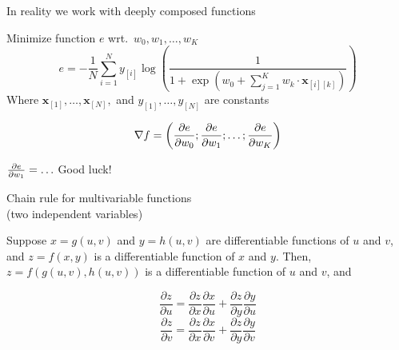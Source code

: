 \documentclass[12pt,aspectratio=169,handout]{beamer}
\begin{document}
\begin{frame}{In reality we work with deeply composed functions}
	
	\begin{example}
		Minimize function $e$ wrt.\ $w_0, w_1, \ldots, w_K$
		$$
		e = - \frac{1}{N} \sum_{i = 1}^{N} y_{[i]} \log
		\left(
		\frac{1}{1 +
			\exp\left( w_0 + \sum_{j=1}^{K} w_k \cdot \bm{x}_{[i][k]} \right)
		}
		\right)
		$$
		Where $\bm{x}_{[1]}, \ldots, \bm{x}_{[N]},$ and $y_{[1]}, \ldots, y_{[N]}$ are constants
	\end{example}
	
	\pause
	
	$$
	\nabla f = \left( \pdv{e}{w_0}; \pdv{e}{w_1}; \ldots; \pdv{e}{w_K} \right)
	$$
	
	$\pdv{e}{w_1} = \ldots$ \pause Good luck!
	
\end{frame}


%	
%	
%	
%	
%	


\begin{frame}{Chain rule for multivariable functions \\ (two independent variables)}
	
	Suppose $x=g(u,v)$ and $y=h(u,v)$ are differentiable functions of $u$ and $v$, and $z=f(x,y)$ is a differentiable function of $x$ and $y$. Then, $z=f(g(u,v),h(u,v))$ is a differentiable function of $u$ and $v$, and
	
	$$
	\frac{\partial z}{\partial u} = \frac{\partial z}{\partial x} \frac{\partial x}{\partial u} + \frac{\partial z}{\partial y} \frac{\partial y}{\partial u}
	$$
	$$
	\frac{\partial z}{\partial v} = \frac{\partial z}{\partial x} \frac{\partial x}{\partial v} + \frac{\partial z}{\partial y} \frac{\partial y}{\partial v}
	$$
	
\end{frame}
\end{document}
